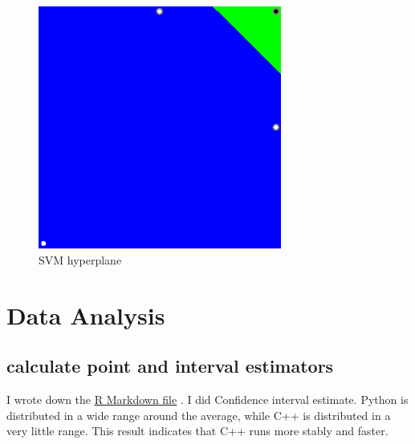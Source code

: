 \documentclass[11pt, a4paper]{article}
\begin{document}
\begin{figure}[htbp]
\centering
\includegraphics[clip, width=80mm]{result.png}
\caption{SVM hyperplane}
\end{figure}

\section{Data Analysis}
\subsection{calculate point and interval estimators}

I wrote down the \href{https://github.com/Rintarooo/time_cpp_python/blob/master/rmarkdown/ds.Rmd}{\underline{R Markdown file}} . I did Confidence interval estimate. Python is distributed in a wide range around the average, while C++ is distributed in a very little range. This result indicates that C++ runs more stably and faster. 

%

\end{document}

